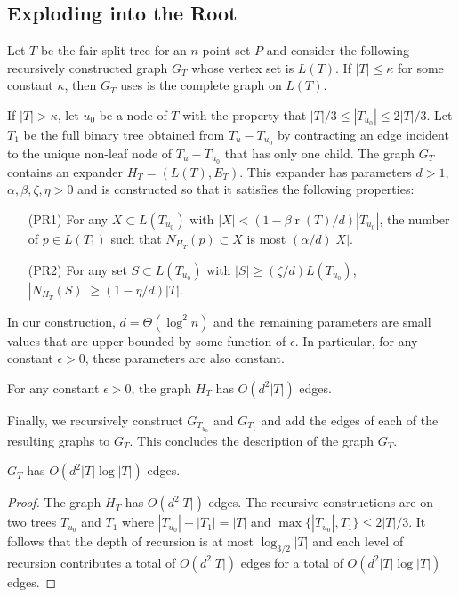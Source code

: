 \documentclass{patmorin}
\DeclareMathOperator{\rank}{r}
\begin{document}
\subsection{Exploding into the Root}

Let $T$ be the fair-split tree for an $n$-point set $P$ and consider
the following recursively constructed graph $G_{T}$ whose vertex set
is $L(T)$.  If $|T| \le \kappa$ for some constant $\kappa$, then $G_T$ uses is the complete graph on $L(T)$.  

If $|T|>\kappa$, let $u_0$ be a node of $T$ with the property that
$|T|/3\le |T_{u_0}|\le 2|T|/3$.  Let $T_1$ be the full binary tree
obtained from $T_u-T_{u_0}$ by contracting an edge incident to the unique
non-leaf node of $T_u-T_{u_0}$ that has only one child.  The graph $G_{T}$
contains an expander $H_T=(L(T),E_T)$. This expander has parameters $d>1$,
$\alpha, \beta,\zeta,\eta > 0$ and is constructed so that it satisfies
the following properties:
\begin{enumerate}
	\item[(PR1)] For any $X\subset L(T_{u_0})$ with
  $|X|<(1-\beta\rank(T)/d)|T_{u_0}|$, the number of $p\in L(T_1)$ such
  that $N_{H_T}(p)\subset X$ is most $(\alpha/d)|X|$.

   \item[(PR2)] For any set $S\subset L(T_{u_0})$ with $|S|\ge (\zeta/d)L(T_{u_0})$, $|N_{H_T}(S)|\ge (1-\eta/d)|T|$.
\end{enumerate}
In our construction, $d=\Theta(\log^2 n)$ and the remaining parameters
are small values that are upper bounded by some function of $\epsilon$. In particular, for any constant $\epsilon >0$, these parameters are also constant.

\begin{clm}
	For any constant $\epsilon>0$, the graph $H_T$ has $O(d^2|T|)$ edges.
\end{clm}

Finally, we recursively construct $G_{T_{u_0}}$ and $G_{T_1}$ and add the
edges of each of the resulting graphs to $G_{T}$. This concludes the description of the graph $G_T$.

\begin{clm}
  $G_{T}$ has $O(d^2|T|\log |T|)$ edges.
\end{clm}

\begin{proof}
  The graph $H_T$ has
  $O(d^2|T|)$ edges.  The recursive constructions are on two trees $T_{u_0}$
  and $T_1$ where $|T_{u_0}|+|T_1|=|T|$ and $\max\{|T_{u_0}|,T_1\}\le
  2|T|/3$. It follows that the depth of recursion is at most
  $\log_{3/2}|T|$ and each level of recursion contributes a total of
  $O(d^2|T|)$ edges for a total of $O(d^2|T|\log|T|)$ edges.
\end{proof}
\end{document}
